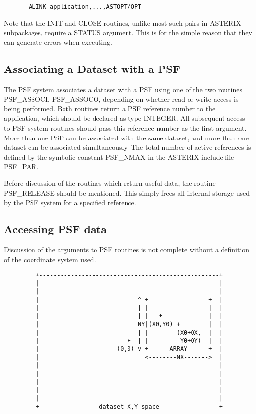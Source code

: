 \begin{verbatim}
       ALINK application,...,ASTOPT/OPT
\end{verbatim}

     Note that the INIT and CLOSE routines, unlike most such pairs
     in ASTERIX subpackages, require a STATUS argument. This is for
     the simple reason that they can generate errors when executing.

\subsection{Associating a Dataset with a PSF}

     The PSF system associates a dataset with a PSF using one of the
     two routines PSF\_ASSOCI, PSF\_ASSOCO, depending on whether read
     or write access is being performed. Both routines return a PSF
     reference number to the application, which should be declared as
     type INTEGER. All subsequent access to PSF system routines should
     pass this reference number as the first argument. More than one
     PSF can be associated with the same dataset, and more than one
     dataset can be associated simultaneously. The total number of
     active references is defined by the symbolic constant PSF\_NMAX
     in the ASTERIX include file PSF\_PAR.

     Before discussion of the routines which return useful data, the
     routine PSF\_RELEASE should be mentioned. This simply frees all
     internal storage used by the PSF system for a specified reference.     

\subsection{Accessing PSF data}

     Discussion of the arguments to PSF routines is not complete 
     without a definition of the coordinate system used. 

\begin{verbatim}
         +---------------------------------------------------+
         |                                                   |     
         |                                                   |     
         |                            ^ +-----------------+  |     
         |                            | |                 |  |     
         |                            | |   +             |  |     
         |                            NY|(X0,Y0) +        |  |     
         |                            | |        (X0+QX,  |  |     
         |                         +  | |         Y0+QY)  |  |     
         |                      (0,0) v +------ARRAY------+  |     
         |                              <--------NX------->  |     
         |                                                   |     
         |                                                   |     
         |                                                   |     
         |                                                   |     
         |                                                   |     
         +---------------- dataset X,Y space ----------------+
\end{verbatim}

